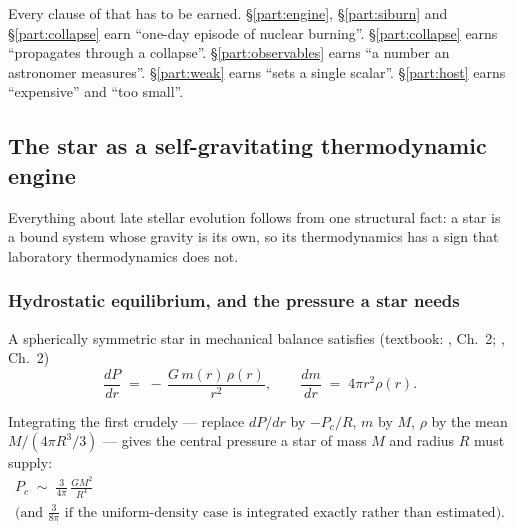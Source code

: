 Every clause of that has to be earned. \S\ref{part:engine},
\S\ref{part:siburn} and \S\ref{part:collapse} earn ``one-day episode of nuclear
burning''. \S\ref{part:collapse} earns ``propagates through a collapse''.
\S\ref{part:observables} earns ``a number an astronomer measures''.
\S\ref{part:weak} earns ``sets a single scalar''. \S\ref{part:host} earns
``expensive'' and ``too small''.

\subsection{The star as a self-gravitating thermodynamic engine}
\label{sec:engine}

Everything about late stellar evolution follows from one structural fact: a star
is a bound system whose gravity is its own, so its thermodynamics has a sign
that laboratory thermodynamics does not.

\subsubsection{Hydrostatic equilibrium, and the pressure a star needs}
\label{sec:hydrostatic}

A spherically symmetric star in mechanical balance satisfies (textbook:
\citealt{kippenhahn2012}, Ch.~2; \citealt{clayton1968}, Ch.~2)
%
\begin{equation}
\frac{dP}{dr} \;=\; -\,\frac{G\,m(r)\,\rho(r)}{r^{2}},
\qquad
\frac{dm}{dr} \;=\; 4\pi r^{2}\rho(r).
\label{eq:hydrostatic}
\end{equation}

Integrating the first crudely --- replace $dP/dr$ by $-P_c/R$, $m$ by $M$,
$\rho$ by the mean $M/(4\pi R^3/3)$ --- gives the central pressure a star of
mass $M$ and radius $R$ must supply:
%
\begin{equation}
\begin{gathered}
P_c \;\sim\; \frac{3}{4\pi}\,\frac{GM^{2}}{R^{4}}\\[2pt]
\text{(and }\tfrac{3}{8\pi}\text{ if the uniform-density case is
integrated exactly rather than estimated).}
\end{gathered}
\label{eq:centralpressure}
\end{equation}

